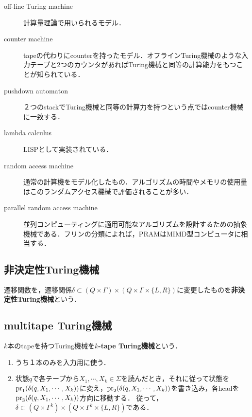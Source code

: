 \documentclass[uplatex, dvipdfmx]{jsreport}
\begin{document}
\begin{tcolorbox}[colframe=ForestGreen, colback=ForestGreen!10!white, breakable]
    \begin{description}
        \item[off-line Turing machine] 計算量理論で用いられるモデル．
        \item[counter machine] tapeの代わりにcounterを持ったモデル．オフラインTuring機械のような入力テープと2つのカウンタがあればTuring機械と同等の計算能力をもつことが知られている．
        \item[pushdown automaton] ２つのstackでTuring機械と同等の計算力を持つという点ではcounter機械に一致する．
        \item[lambda calculus] LISPとして実装されている．
        \item[random access machine] 通常の計算機をモデル化したもの．アルゴリズムの時間やメモリの使用量はこのランダムアクセス機械で評価されることが多い．
        \item[parallel random access machine] 並列コンピューティングに適用可能なアルゴリズムを設計するための抽象機械である．フリンの分類によれば，PRAMはMIMD型コンピュータに相当する．
    \end{description}
\end{tcolorbox}

\subsection{非決定性Turing機械}

\begin{definition}
    遷移関数を，遷移関係$\delta\subset(Q\times\Gamma)\times(Q\times\Gamma\times\{L,R\})$に変更したものを\textbf{非決定性Turing機械}という．
\end{definition}

\subsection{multitape Turing機械}

\begin{definition}
    $k$本のtapeを持つTuring機械を\textbf{$k$-tape Turing機械}という．
    \begin{enumerate}
        \item うち１本のみを入力用に使う．
        \item 状態$q$で各テープから$X_1,\cdots,X_k\in\Sigma$を読んだとき，それに従って状態を$\mathrm{pr}_1(\delta(q,X_1,\cdots,X_k))$に変え，$\mathrm{pr}_2(\delta(q,X_1,\cdots,X_k))$を書き込み，各headを$\mathrm{pr}_3(\delta(q,X_1,\cdots,X_k))$方向に移動する．
        従って，$\delta\subset(Q\times\Gamma^k)\times(Q\times\Gamma^k\times\{L,R\})$である．
    \end{enumerate}
\end{definition}
\end{document}

